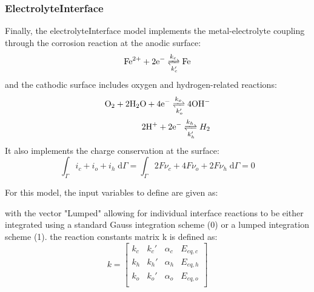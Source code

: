 \documentclass[3p]{elsarticle} %
\begin{document}
\subsubsection{ElectrolyteInterface}
Finally, the electrolyteInterface model implements the metal-electrolyte coupling through the corrosion reaction at the anodic surface:
\begin{equation}
    \mathrm{Fe}^{2+}+2\mathrm{e}^-\xrightleftharpoons[k_{c}']{k_{c}}\mathrm{Fe}
\end{equation}
and the cathodic surface includes oxygen and hydrogen-related reactions:
\begin{align}
    \mathrm{O}_2+2\mathrm{H}_2\mathrm{O} +4\mathrm{e}^-\xrightleftharpoons[k_{o}']{k_{o}} 4 \mathrm{OH}^- \\
    2\mathrm{H}^+ + 2\mathrm{e}^-\xrightleftharpoons[k_{h}']{k_{h}} H_2 
\end{align}
It also implements the charge conservation at the surface:
\begin{equation}
    \int_\Gamma i_c+i_o+i_h\;\mathrm{d}\Gamma = \int_\Gamma 2F\nu_c + 4F\nu_o + 2F\nu_h \;\mathrm{d}\Gamma= 0
    \label{eq:current_conservation}
\end{equation}

For this model, the input variables to define are given as:

with the vector "Lumped" allowing for individual interface reactions to be either integrated using a standard Gauss integration scheme (0) or a lumped integration scheme (1). the reaction constants matrix k is defined as:
\begin{equation}
	k = \begin{bmatrix} 
	k_{c} & k_{c}' & \alpha_{c} & E_{eq,c} \\ 
	k_{h} & k_{h}' & \alpha_{h} & E_{eq,h} \\ 
	k_{o} & k_{o}' & \alpha_{o} & E_{eq,o} \\ 
	\end{bmatrix}
\end{equation}
\end{document}
